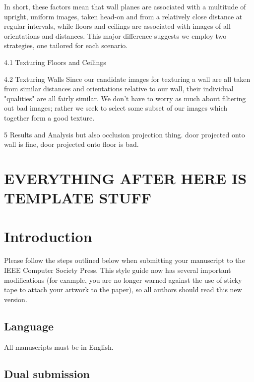 \documentclass[10pt,twocolumn,letterpaper]{article}
\begin{document}
In short, these factors mean that wall planes are associated with a multitude of upright, uniform images, taken head-on and from a relatively close distance at regular intervals, while floors and ceilings are associated with images of all orientations and distances. This major difference suggests we employ two strategies, one tailored for each scenario.



4.1 Texturing Floors and Ceilings




4.2 Texturing Walls
Since our candidate images for texturing a wall are all taken from similar distances and orientations relative to our wall, their individual "qualities" are all fairly similar. We don't have to worry as much about filtering out bad images; rather we seek to select some subset of our images which together form a good texture.

5 Results and Analysis
but also occlusion projection thing. door projected onto wall is fine, door projected onto floor is bad.

\section{EVERYTHING AFTER HERE IS TEMPLATE STUFF}






\section{Introduction}

Please follow the steps outlined below when submitting your manuscript
to the IEEE Computer Society Press.  This style guide now has several
important modifications (for example, you are no longer warned against
the use of sticky tape to attach your artwork to the paper), so all
authors should read this new version.

\subsection{Language}

All manuscripts must be in English.

\subsection{Dual submission}
\end{document}
